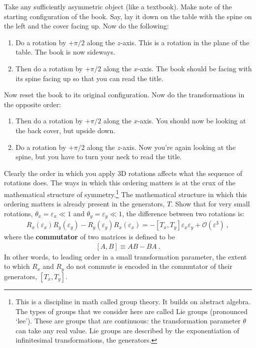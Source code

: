\documentclass[12pt]{article}
\numberwithin{equation}{section}    %
\begin{document}
Take any sufficiently asymmetric object (like a textbook). Make note of the starting configuration of the book. Say, lay it down on the table with the spine on the left and the cover facing up. Now do the following:
\begin{enumerate}
	\item Do a rotation by $+\pi/2$ along the $z$-axis. This is a rotation in the plane of the table. The book is now sideways.
	\item Then do a rotation by $+\pi/2$ along the $x$-axis. The book should be facing with its spine facing up so that you can read the title. 
\end{enumerate}
Now reset the book to its original configuration. Now do the transformations in the opposite order:
\begin{enumerate}
	\item Then do a rotation by $+\pi/2$ along the $x$-axis. You should now be looking at the back cover, but upside down.
	\item Do a rotation by $+\pi/2$ along the $z$-axis. Now you're again looking at the spine, but you have to turn your neck to read the title.
\end{enumerate}
Clearly the order in which you apply 3D rotations affects what the sequence of rotations does. The ways in which this ordering matters is at the crux of the mathematical structure of symmetry.\footnote{This is a discipline in math called group theory. It builds on abstract algebra. The types of groups that we consider here are called Lie groups (pronounced `lee'). These are groups that are continuous: the transformation parameter $\theta$ can take any real value. Lie groups are described by the exponentiation of infinitesimal transformations, the generators.} The mathematical structure in which this ordering matters is already present in the generators, $T$. Show that for very small rotations, $\theta_x = \varepsilon_x \ll 1$ and $\theta_y = \varepsilon_y \ll 1$, the difference between two rotations is:
\begin{align}
	R_x(\varepsilon_x) R_y(\varepsilon_y)
	-
	R_y(\varepsilon_y) R_x(\varepsilon_x)
	= 
	-\left[T_x,T_y\right]\varepsilon_x\varepsilon_y 
	+ \mathcal O(\varepsilon^3) \ ,
\end{align}
where the \textbf{commutator} of two matrices is defined to be
\begin{align}
	\left[A,B\right] \equiv AB - BA \ .
\end{align}
In other words, to leading order in a small transformation parameter, the extent to which $R_x$ and $R_y$ do not commute is encoded in the commutator of their generators, $[T_x,T_y]$.
\end{document}
